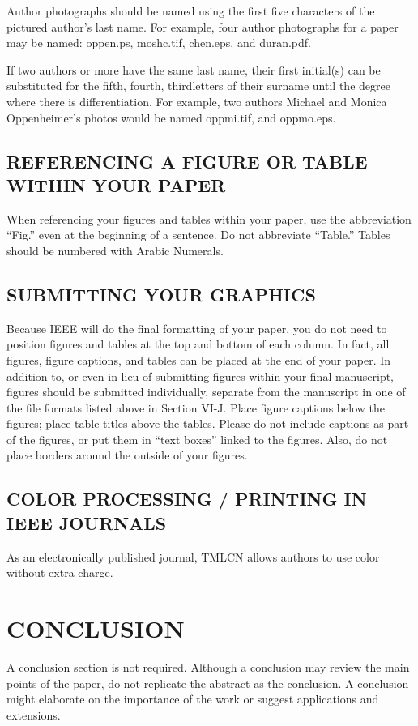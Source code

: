 \documentclass{ieeetmlcn}
\begin{document}
Author photographs should be named using the first five characters of the
pictured author's last name. For example, four author photographs for a
paper may be named: oppen.ps, moshc.tif, chen.eps, and duran.pdf.

If two authors or more have the same last name, their first initial(s) can
be substituted for the fifth, fourth, third\textellipsis letters of their surname
until the degree where there is differentiation. For example, two authors
Michael and Monica Oppenheimer's photos would be named oppmi.tif, and
oppmo.eps.

\subsection{REFERENCING A FIGURE OR TABLE WITHIN YOUR PAPER}
When referencing your figures and tables within your paper, use the
abbreviation ``Fig.'' even at the beginning of a sentence. Do not abbreviate
``Table.'' Tables should be numbered with Arabic Numerals.

\subsection{SUBMITTING YOUR GRAPHICS}
Because IEEE will do the final formatting of your paper,
you do not need to position figures and tables at the top and bottom of each
column. In fact, all figures, figure captions, and tables can be placed at
the end of your paper. In addition to, or even in lieu of submitting figures
within your final manuscript, figures should be submitted individually,
separate from the manuscript in one of the file formats listed above in
Section VI-J. Place figure captions below the figures; place table titles
above the tables. Please do not include captions as part of the figures, or
put them in ``text boxes'' linked to the figures. Also, do not place borders
around the outside of your figures.

\subsection{COLOR PROCESSING / PRINTING IN IEEE JOURNALS}
As an electronically published journal, TMLCN allows authors to use color without extra charge.

\section{CONCLUSION}
A conclusion section is not required. Although a conclusion may review the
main points of the paper, do not replicate the abstract as the conclusion. A
conclusion might elaborate on the importance of the work or suggest
applications and extensions.
\end{document}
